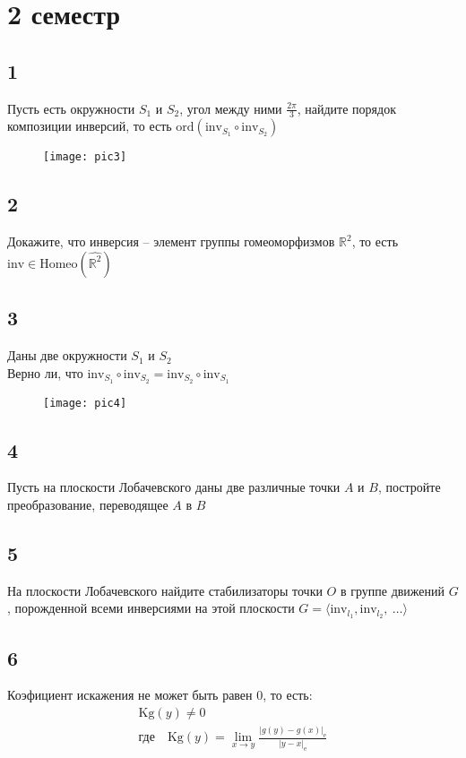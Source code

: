 \newpage
\section{2 семестр}
	\subsection*{1}
	Пусть есть окружности $S_1$ и $S_2$, угол между ними $\frac{2\pi}{3}$, найдите порядок композиции инверсий, то есть $\text{ord}(\text{inv}_{S_1} \circ \text{inv}_{S_2})$
	\begin{figure}[h]
		\texttt{[image: pic3]}
	\end{figure}
	
	\subsection*{2}
	Докажите, что инверсия -- элемент группы гомеоморфизмов $\mathbb{R}^2$, то есть $\text{inv} \in \text{Homeo}(\widehat{\mathbb{R}^2})$
	
	\subsection*{3}
	Даны две окружности $S_1$ и $S_2$\\
	Верно ли, что $\text{inv}_{S_{1}} \circ \text{inv}_{S_{2}} = \text{inv}_{S_{2}} \circ \text{inv}_{S_{1}}$
	\begin{figure}[h]
		\texttt{[image: pic4]}
	\end{figure}
	
	\subsection*{4}
	Пусть на плоскости Лобачевского даны две различные точки $A$ и $B$, постройте преобразование, переводящее $A$ в $B$
	
	\subsection*{5}
	На плоскости Лобачевского найдите стабилизаторы точки $O$ в группе движений $G$, порожденной всеми инверсиями на этой плоскости $G = \langle \text{inv}_{l_{1}}, \text{inv}_{l_{2}},\: \ldots \rangle$
	
	\subsection*{6}
	Коэфициент искажения не может быть равен $0$, то есть:
	\begin{gather*}
		\text{Kg}(y) \ne 0\\
		\text{где}\quad \text{Kg}(y) = \lim\limits_{x \to y} \frac{|g(y) - g(x)|_{\text{e}}}{|y - x|_{\text{e}}}
	\end{gather*}
\newpage
